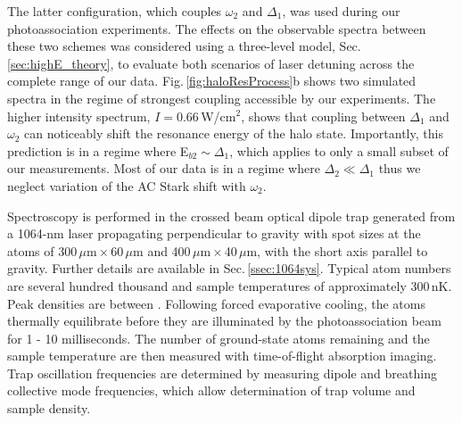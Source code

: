 The latter configuration, which couples $\omega_2$ and $\Delta_1$, was used during our photoassociation experiments.
The effects on the observable spectra between these two schemes was considered using a three-level model, Sec.\,\ref{sec:highE_theory}, to evaluate both scenarios of laser detuning across the complete range of our data.
Fig.\,\ref{fig:haloResProcess}b shows two simulated spectra in the regime of strongest coupling accessible by our experiments.
The higher intensity spectrum, $I=0.66$\,W/cm$^2$, shows that coupling between $\Delta_1$ and $\omega_2$ can noticeably shift the resonance energy of the halo state. 
Importantly, this prediction is in a regime where E$_{b2} \sim \Delta_1$, which applies to only a small subset of our measurements.
Most of our data is in a regime where $\Delta_2 \ll \Delta_1$ thus we neglect variation of the AC Stark shift with $\omega_2$.




Spectroscopy is performed in the crossed beam optical dipole trap generated from a 1064-nm laser propagating perpendicular to gravity with spot sizes at the atoms of 300\,$\mu$m\,$\times$\,60\,$\mu$m and 400\,$\mu$m\,$\times$\,40\,$\mu$m, with the short axis parallel to gravity.
Further details are available in Sec.\,\ref{ssec:1064sys}.
Typical atom numbers are several hundred thousand and sample temperatures of approximately 300\,nK.
Peak densities are between .
Following forced evaporative cooling, the atoms thermally equilibrate before they are illuminated by the photoassociation beam for 1 - 10 milliseconds.
The number of ground-state atoms remaining and the sample temperature are then measured with time-of-flight absorption imaging.
Trap oscillation frequencies are determined by measuring dipole and breathing collective mode frequencies, which allow determination of trap volume and sample density.
 
